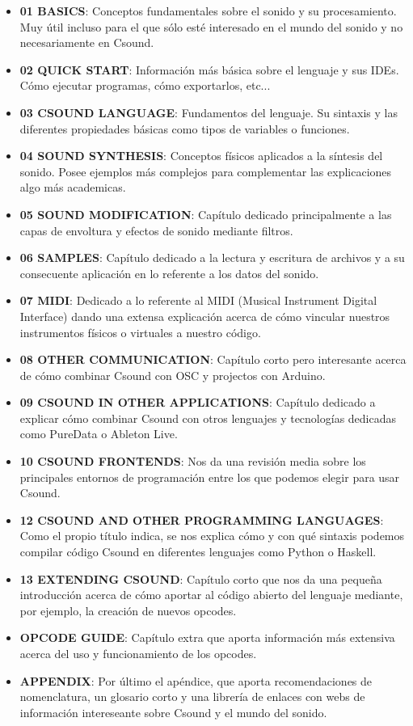 \begin{itemize}
 \item \textbf{01 BASICS}: Conceptos fundamentales sobre el sonido y su procesamiento. Muy útil incluso para el que sólo esté interesado en el mundo del sonido y no necesariamente en Csound.
 \item \textbf{02 QUICK START}: Información más básica sobre el lenguaje y sus IDEs. Cómo ejecutar programas, cómo exportarlos,  etc...
 \item \textbf{03 CSOUND LANGUAGE}: Fundamentos del lenguaje. Su sintaxis y las diferentes propiedades básicas como tipos de variables o funciones.
 \item \textbf{04 SOUND SYNTHESIS}: Conceptos físicos aplicados a la síntesis del sonido. Posee ejemplos más complejos para complementar las explicaciones algo más academicas.
 \item \textbf{05 SOUND MODIFICATION}: Capítulo dedicado principalmente a las capas de envoltura y efectos de sonido mediante filtros.
 \item \textbf{06 SAMPLES}: Capítulo dedicado a la lectura y escritura de archivos y a su consecuente aplicación en lo referente a los datos del sonido.
 \item \textbf{07 MIDI}: Dedicado a lo referente al MIDI (Musical Instrument Digital Interface) dando una extensa explicación acerca de cómo vincular nuestros instrumentos físicos o virtuales a nuestro código.
 \item \textbf{08 OTHER COMMUNICATION}: Capítulo corto pero interesante acerca de cómo combinar Csound con OSC y projectos con Arduino.
 \item \textbf{09 CSOUND IN OTHER APPLICATIONS}: Capítulo dedicado a explicar cómo combinar Csound con otros lenguajes y tecnologías dedicadas como PureData o Ableton Live.
 \item \textbf{10 CSOUND FRONTENDS}: Nos da una revisión media sobre los principales entornos de programación entre los que podemos elegir para usar Csound.
 \item \textbf{12 CSOUND AND OTHER PROGRAMMING LANGUAGES}: Como el propio título indica, se nos explica cómo y con qué sintaxis podemos compilar código Csound en diferentes lenguajes como Python  o Haskell.
 \item \textbf{13 EXTENDING CSOUND}: Capítulo corto que nos da una pequeña introducción acerca de cómo aportar al código abierto del lenguaje mediante, por ejemplo, la creación de nuevos opcodes.
 \item \textbf{OPCODE GUIDE}: Capítulo extra que aporta información más extensiva acerca del uso y funcionamiento de los opcodes.
 \item \textbf{APPENDIX}: Por último el apéndice, que aporta recomendaciones de nomenclatura, un glosario corto y una librería de enlaces con webs de información intereseante sobre Csound y el mundo del sonido.
\end{itemize}


